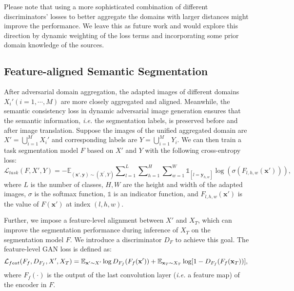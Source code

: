 \documentclass{article}
\begin{document}
Please note that using a more sophisticated combination of different discriminators' losses to better aggregate the domains with larger distances might improve the performance. We leave this as future work and would explore this direction by dynamic weighting of the loss terms and incorporating some prior domain knowledge of the sources.


\subsection{Feature-aligned Semantic Segmentation} After adversarial domain aggregation, the adapted images of different domains $X_{i}'(i=1,\cdots,M)$ are more closely aggregated and aligned. Meanwhile, the semantic consistency loss in dynamic adversarial image generation ensures that the semantic information, \textit{i.e.} the segmentation labels, is preserved before and after image translation. Suppose the images of the unified aggregated domain are $X'=\bigcup\limits_{i=1}^{M}X_{i}'$ and corresponding labels are
$Y=\bigcup\limits_{i=1}^{M}Y_i$. We can then train a task segmentation model $F$ based on $X'$ and $Y$ with the following cross-entropy loss:
\begin{equation}
\mathcal{L}_{task}(F,X',Y)=-\mathbb{E}_{(\mathbf{x}',\mathbf{y})\sim (X^{'},Y)}\sum\nolimits_{l=1}^{L}\sum\nolimits_{h=1}^{H}\sum\nolimits_{w=1}^{W}\mathds{1}_{[l=\mathbf{y}_{h,w}]}\log(\sigma(F_{l,h,w}(\mathbf{x}'))),
\label{equ:f_loss}
\end{equation}
where $L$ is the number of classes, $H,W$ are the height and width of the adapted images, $\sigma$ is the softmax function,  $\mathds{1}$ is an indicator function, and $F_{l,h,w}(\mathbf{x}')$ is the value of $F(\mathbf{x}')$ at index $(l,h,w)$.

Further, we impose a feature-level alignment between $X'$ and $X_T$, which can improve the segmentation performance during inference of $X_T$ on the segmentation model $F$. We introduce a discriminator $D_F$ to achieve this goal. The feature-level GAN loss is defined as:
\begin{equation}
\mathcal{L}_{feat}(F_f,D_{F_f}, X', X_T)=\mathbb{E}_{\mathbf{x}'\sim X'}\log D_{F_f}(F_f(\mathbf{x}'))+\mathbb{E}_{\mathbf{x}_T\sim X_T}\log [1-D_{F_f}(F_f(\mathbf{x}_T))],\\
\label{equ:ganFeature}
\end{equation}
where $F_f(\cdot)$ is the output of the last convolution layer (\textit{i.e.} a feature map) of the encoder in $F$.
\end{document}

